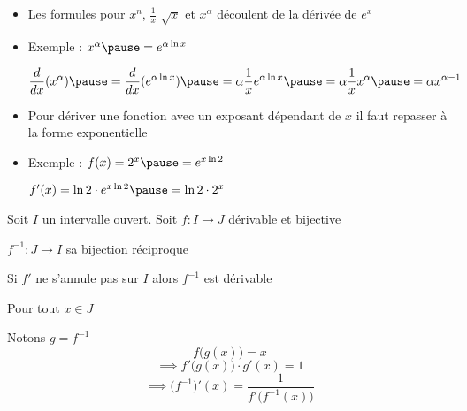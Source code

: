 \begin{frame}
\begin{remarque}
\begin{itemize}
\setlength{\itemsep}{7pt} 
  \item Les formules pour $x^n$, $\frac 1x$ $\sqrt x$ et $x^\alpha$ découlent de la dérivée de $e^x$
\pause
  \item Exemple : $x^\alpha \pause= e^{\alpha \ln x}$ 
\pause
\centerline{$\displaystyle \frac{d }{dx}(x^\alpha) \pause= \frac{d}{dx} (e^{\alpha \ln x}) 
\pause= \alpha \frac{1}{x} e^{\alpha \ln x} \pause=\alpha \frac 1x x^{\alpha} \pause=\alpha x^{\alpha-1}$}
\pause
  \item Pour dériver une fonction avec un exposant dépendant de $x$ il faut repasser à la forme exponentielle

\pause
  \item Exemple : $f(x)= 2^x \pause= e^{x\ln 2}$ 
\pause
\centerline{$f'(x)= \ln 2  \cdot e^{x\ln 2} \pause= \ln 2 \cdot 2^x$}
\end{itemize}

\end{remarque}

\end{frame}

\begin{frame}
Soit $I$ un intervalle ouvert. Soit $f : I \to J$ dérivable et bijective

 $f^{-1} : J \to I$ sa bijection réciproque

\pause

\begin{corollaire}
Si $f'$ ne s'annule pas sur $I$ alors $f^{-1}$ est dérivable

\pause

Pour tout $x \in J$ 
\end{corollaire}

\pause

Notons $g=f^{-1}$
\pause
\vspace*{-2ex}
$$f\big( g(x) \big)  = x$$ 
\pause
\vspace*{-2ex}
$$\implies f'\big(g(x)\big) \cdot g'(x) = 1 $$
\pause
\vspace*{-2ex}
$$\implies \big(f^{-1}\big)'(x)= \frac{1}{f'\big( f^{-1}(x) \big)}$$
\end{frame}


